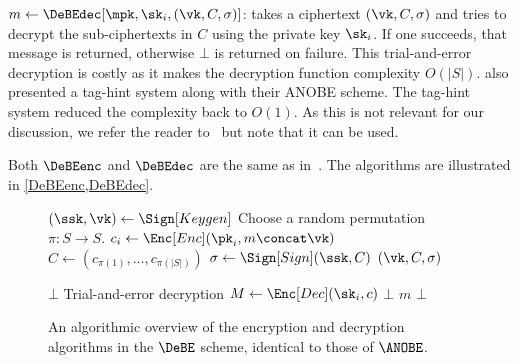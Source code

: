 \(m\gets \DeBEdec[\mpk, \sk_i, (\vk, C, \sigma)]\):
takes a ciphertext \((\vk, C, \sigma)\) and tries to decrypt the sub-ciphertexts 
in \(C\) using the private key \(\sk_i\).
If one succeeds, that message is returned, otherwise \(\bot\) is returned on 
failure.
This trial-and-error decryption is costly as it makes the decryption function 
complexity \(O(|S|)\).
\textcite{ANOBE} also presented a tag-hint system along with their \ac{ANOBE} 
scheme.
The tag-hint system reduced the complexity back to \(O(1)\).
As this is not relevant for our discussion, we refer the reader to~\cite{ANOBE} 
but note that it can be used.

Both \(\DeBEenc\) and \(\DeBEdec\) are the same as in~\cite{ANOBE}.
The algorithms are illustrated in \cref{DeBEenc,DeBEdec}.

\begin{frame}
  \begin{figure}
    \begin{algorithmic}

        \State $(\ssk, \vk)\gets \Sign[Keygen]$
        \State Choose a random permutation \(\pi\colon S\to S\).
          \State $c_i\gets \Enc[Enc](\pk_i, m\concat \vk)$
        \EndFor
        \State $C\gets ( c_{\pi(1)}, \dotsc, c_{\pi(|S|)} )$
        \State $\sigma\gets \Sign[Sign](\ssk, C)$
        \State \Return $(\vk, C, \sigma)$
      \EndFunction

          \State \Return $\bot$
        \EndIf
          \Comment Trial-and-error decryption
          \State $M\gets{\Enc[Dec](\sk_i, c)}$
            \State \Return $\bot$
            \State \Return $m$
          \EndIf
        \EndFor
        \State \Return $\bot$
      \EndFunction
    \end{algorithmic}
    \caption{\label{DeBEenc}\label{DeBEdec}%
      An algorithmic overview of the encryption and decryption algorithms in the 
      \(\DeBE\) scheme, identical to those of \(\ANOBE\).%
    }
  \end{figure}
\end{frame}

